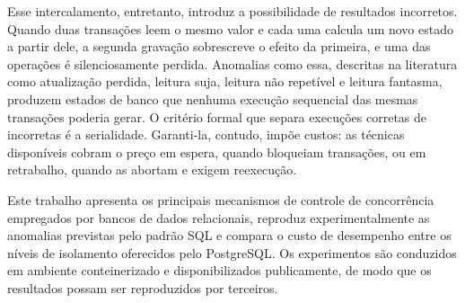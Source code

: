 \documentclass[12pt]{article}
\begin{document}
Esse intercalamento, entretanto, introduz a possibilidade de resultados
incorretos. Quando duas transações leem o mesmo valor e cada uma calcula um novo
estado a partir dele, a segunda gravação sobrescreve o efeito da primeira, e uma
das operações é silenciosamente perdida. Anomalias como essa, descritas na
literatura como atualização perdida, leitura suja, leitura não repetível e
leitura fantasma, produzem estados de banco que nenhuma execução
sequencial das mesmas transações poderia gerar. O critério formal que
separa execuções corretas de incorretas é a serialidade. 
Garanti-la, contudo, impõe custos: as técnicas disponíveis
cobram o preço em espera, quando bloqueiam transações, ou em
retrabalho, quando as abortam e exigem reexecução.
 
Este trabalho apresenta os principais mecanismos de controle de concorrência
empregados por bancos de dados relacionais, reproduz experimentalmente as
anomalias previstas pelo padrão SQL e compara o custo de desempenho entre os
níveis de isolamento oferecidos pelo PostgreSQL. Os experimentos são conduzidos
em ambiente conteinerizado e disponibilizados publicamente, de modo que os
resultados possam ser reproduzidos por terceiros.



\end{document}
